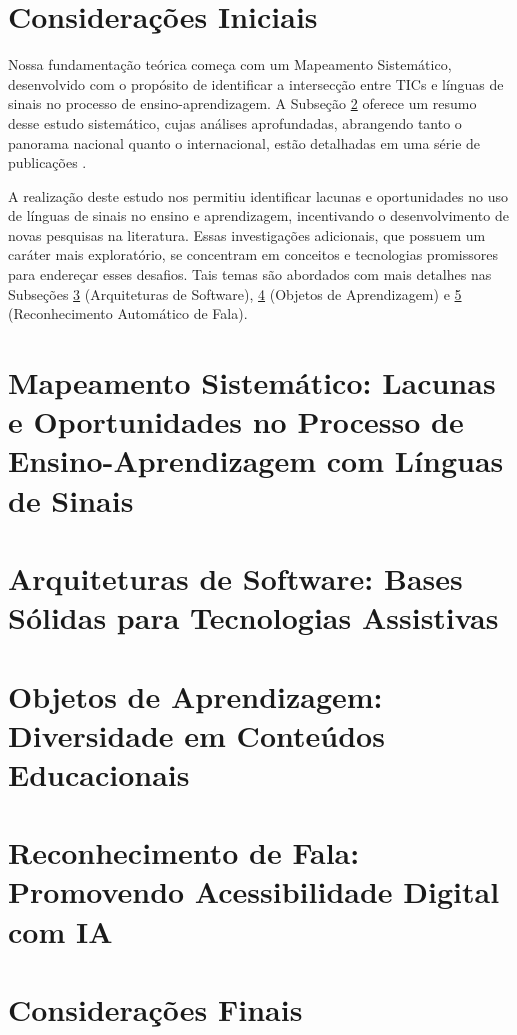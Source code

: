\section{Considerações Iniciais}

Nossa fundamentação teórica começa com um Mapeamento Sistemático, desenvolvido com o propósito de identificar a intersecção entre TICs e línguas de sinais no processo de ensino-aprendizagem. A Subseção \ref{section:foundation:sm} oferece um resumo desse estudo sistemático, cujas análises aprofundadas, abrangendo tanto o panorama nacional quanto o internacional, estão detalhadas em uma série de publicações \cite{FalvoJr2020_FIE, FalvoJr2020_SBIE, FalvoJr2020_RENOTE}.

A realização deste estudo nos permitiu identificar lacunas e oportunidades no uso de línguas de sinais no ensino e aprendizagem, incentivando o desenvolvimento de novas pesquisas na literatura. Essas investigações adicionais, que possuem um caráter mais exploratório, se concentram em conceitos e tecnologias promissores para endereçar esses desafios. Tais temas são abordados com mais detalhes nas Subseções \ref{section:foundation:arch} (Arquiteturas de Software), \ref{section:foundation:lo} (Objetos de Aprendizagem) e \ref{section:foundation:asr} (Reconhecimento Automático de Fala).

\section{Mapeamento Sistemático: Lacunas e Oportunidades no Processo de Ensino-Aprendizagem com Línguas de Sinais}
\label{section:foundation:sm}



\section{Arquiteturas de Software: Bases Sólidas para Tecnologias Assistivas}
\label{section:foundation:arch}

\section{Objetos de Aprendizagem: Diversidade em Conteúdos Educacionais}
\label{section:foundation:lo}

\section{Reconhecimento de Fala: Promovendo Acessibilidade Digital com IA}
\label{section:foundation:asr}

\section{Considerações Finais}